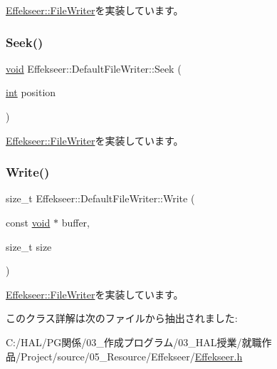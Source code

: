\mbox{\hyperlink{class_effekseer_1_1_file_writer_a656bbee191e65ccc63791d5c41c6e853}{Effekseer\+::\+File\+Writer}}を実装しています。

\mbox{\label{class_effekseer_1_1_default_file_writer_a2329533000c58267e8e2457f3480bf73}} 
\subsubsection{\texorpdfstring{Seek()}{Seek()}}
{\footnotesize\ttfamily \mbox{\hyperlink{namespace_effekseer_ab34c4088e512200cf4c2716f168deb56}{void}} Effekseer\+::\+Default\+File\+Writer\+::\+Seek (\begin{DoxyParamCaption}\item[{\mbox{\hyperlink{namespace_effekseer_ace0abf7c2e6947e519ebe8b54cbcc30a}{int}}}]{position }\end{DoxyParamCaption})\hspace{0.3cm}{\ttfamily [virtual]}}



\mbox{\hyperlink{class_effekseer_1_1_file_writer_a9057c57df33d5112bc0d2c4e3e0c542d}{Effekseer\+::\+File\+Writer}}を実装しています。

\mbox{\label{class_effekseer_1_1_default_file_writer_afceaff03cd45477058ffdc1370d06884}} 
\subsubsection{\texorpdfstring{Write()}{Write()}}
{\footnotesize\ttfamily size\+\_\+t Effekseer\+::\+Default\+File\+Writer\+::\+Write (\begin{DoxyParamCaption}\item[{const \mbox{\hyperlink{namespace_effekseer_ab34c4088e512200cf4c2716f168deb56}{void}} $\ast$}]{buffer,  }\item[{size\+\_\+t}]{size }\end{DoxyParamCaption})\hspace{0.3cm}{\ttfamily [virtual]}}



\mbox{\hyperlink{class_effekseer_1_1_file_writer_a7bdd5dc4f70f8e83c03de7e96af5dc27}{Effekseer\+::\+File\+Writer}}を実装しています。



このクラス詳解は次のファイルから抽出されました\+:\begin{DoxyCompactItemize}
\item 
C\+:/\+H\+A\+L/\+P\+G関係/03\+\_\+作成プログラム/03\+\_\+\+H\+A\+L授業/就職作品/\+Project/source/05\+\_\+\+Resource/\+Effekseer/\mbox{\hyperlink{_effekseer_8h}{Effekseer.\+h}}\end{DoxyCompactItemize}
